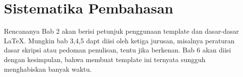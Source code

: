 \section{Sistematika Pembahasan}
\label{sec:sispem}
Rencananya Bab 2 akan berisi petunjuk penggunaan template dan dasar-dasar \LaTeX.
Mungkin bab 3,4,5 dapt diisi oleh ketiga jurusan, misalnya peraturan dasar skripsi atau pedoman penulisan, tentu jika berkenan.
Bab 6 akan diisi dengan kesimpulan, bahwa membuat template ini ternyata sungguh menghabiskan banyak waktu.

